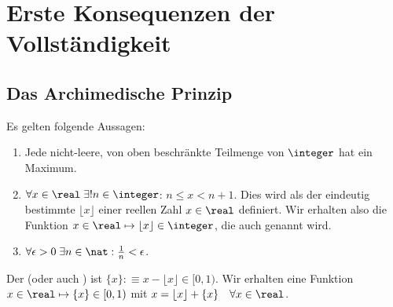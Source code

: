 \section{Erste Konsequenzen der Vollständigkeit}

\subsection{Das Archimedische Prinzip}

\begin{thm}
  \label{thm: das archimedische prinzip}
  \phantom{.}
  Es gelten folgende Aussagen:
  \begin{enumerate}
    \item Jede nicht-leere, von oben beschränkte Teilmenge von $\integer$ hat ein Maximum.
    \item $\forall x \in \real \; \exists! n \in \integer$: $n \leq x < n+1$. Dies wird als der eindeutig bestimmte  $\lfloor x \rfloor$ einer reellen Zahl $x \in \real$ definiert. Wir erhalten also die Funktion $x \in \real \mapsto \lfloor x \rfloor \in \integer$, die auch  genannt wird.
    \item $\forall \epsilon > 0 \; \exists n \in \nat: \frac{1}{n} < \epsilon$.
  \end{enumerate}
\end{thm}

Der  (oder auch ) ist $\{ x\} :\equiv x - \lfloor x \rfloor \in [0,1)$. Wir erhalten eine Funktion $x \in \real \mapsto \{ x\} \in [0, 1)$ mit $x=\lfloor x \rfloor + \{ x\} \quad \forall x \in \real$.


